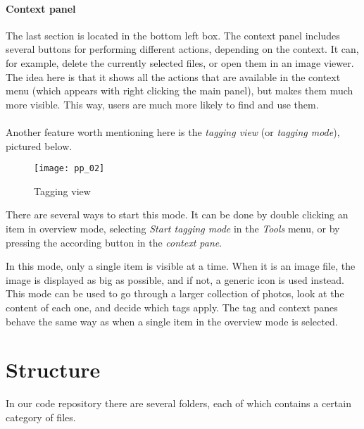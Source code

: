 \paragraph{Context panel} The last section is located in the bottom left box.
The context panel includes several buttons for performing different actions,
depending on the context. It can, for example, delete the currently selected
files, or open them in an image viewer. The idea here is that it shows all the
actions that are available in the context menu (which appears with right
clicking the main panel), but makes them much more visible. This way, users are
much more likely to find and use them.

\paragraph{}
Another feature worth mentioning here is the \emph{tagging view} (or
\emph{tagging mode}), pictured below. %

\begin{figure}[!h]
	\centering
	\texttt{[image: pp\_02]}
	\caption{Tagging view}
\end{figure}

There are several ways to start this mode. It can be done by double clicking
an item in overview mode, selecting \emph{Start tagging mode} in the 
\emph{Tools} menu, or by pressing the according button in the \emph{context pane}. 

In this mode, only a single item is visible at a time.
When it is an image file, the image is displayed as big as
possible, and if not, a generic icon is used instead. This mode can be used to
go through a larger collection of photos, look at the content of each one, and
decide which tags apply. The tag and context panes behave the same way as 
when a single item in the overview mode is selected.


\section{Structure}
\def\kapitelautor{Clemens Stadlbauer}

In our code repository there are several folders, each of which contains a
certain category of files.


